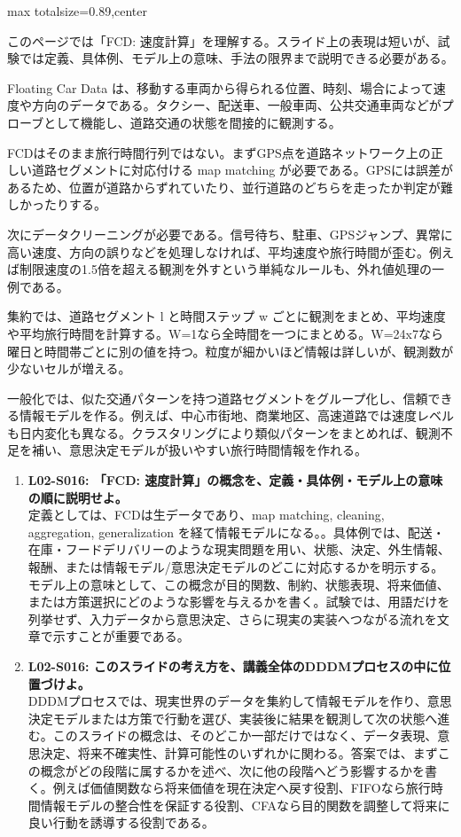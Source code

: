 \begin{minipage}[t]{0.58\textwidth}
\begin{adjustbox}{max totalsize={\textwidth}{0.89\textheight},center}
\begin{minipage}{\textwidth}\scriptsize
{}このページでは「FCD: 速度計算」を理解する。スライド上の表現は短いが、試験では定義、具体例、モデル上の意味、手法の限界まで説明できる必要がある。\par
Floating Car Data は、移動する車両から得られる位置、時刻、場合によって速度や方向のデータである。タクシー、配送車、一般車両、公共交通車両などがプローブとして機能し、道路交通の状態を間接的に観測する。\par
FCDはそのまま旅行時間行列ではない。まずGPS点を道路ネットワーク上の正しい道路セグメントに対応付ける map matching が必要である。GPSには誤差があるため、位置が道路からずれていたり、並行道路のどちらを走ったか判定が難しかったりする。\par
次にデータクリーニングが必要である。信号待ち、駐車、GPSジャンプ、異常に高い速度、方向の誤りなどを処理しなければ、平均速度や旅行時間が歪む。例えば制限速度の1.5倍を超える観測を外すという単純なルールも、外れ値処理の一例である。\par
集約では、道路セグメント l と時間ステップ w ごとに観測をまとめ、平均速度や平均旅行時間を計算する。W=1なら全時間を一つにまとめる。W=24x7なら曜日と時間帯ごとに別の値を持つ。粒度が細かいほど情報は詳しいが、観測数が少ないセルが増える。\par
一般化では、似た交通パターンを持つ道路セグメントをグループ化し、信頼できる情報モデルを作る。例えば、中心市街地、商業地区、高速道路では速度レベルも日内変化も異なる。クラスタリングにより類似パターンをまとめれば、観測不足を補い、意思決定モデルが扱いやすい旅行時間情報を作れる。\par{}\begin{enumerate}\item \textbf{L02-S016: 「FCD: 速度計算」の概念を、定義・具体例・モデル上の意味の順に説明せよ。}\\定義としては、FCDは生データであり、map matching, cleaning, aggregation, generalization を経て情報モデルになる。。具体例では、配送・在庫・フードデリバリーのような現実問題を用い、状態、決定、外生情報、報酬、または情報モデル/意思決定モデルのどこに対応するかを明示する。モデル上の意味として、この概念が目的関数、制約、状態表現、将来価値、または方策選択にどのような影響を与えるかを書く。試験では、用語だけを列挙せず、入力データから意思決定、さらに現実の実装へつながる流れを文章で示すことが重要である。\item \textbf{L02-S016: このスライドの考え方を、講義全体のDDDMプロセスの中に位置づけよ。}\\DDDMプロセスでは、現実世界のデータを集約して情報モデルを作り、意思決定モデルまたは方策で行動を選び、実装後に結果を観測して次の状態へ進む。このスライドの概念は、そのどこか一部だけではなく、データ表現、意思決定、将来不確実性、計算可能性のいずれかに関わる。答案では、まずこの概念がどの段階に属するかを述べ、次に他の段階へどう影響するかを書く。例えば価値関数なら将来価値を現在決定へ戻す役割、FIFOなら旅行時間情報モデルの整合性を保証する役割、CFAなら目的関数を調整して将来に良い行動を誘導する役割である。\end{enumerate}

\end{minipage}
\end{adjustbox}
\end{minipage}

